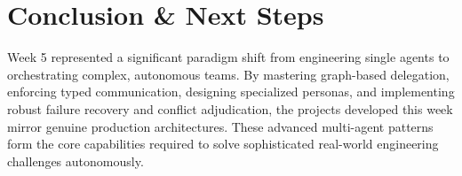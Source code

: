 \documentclass[12pt, a4paper]{article}
\begin{document}
\vspace{0.5cm}

\section{Conclusion \& Next Steps}
Week 5 represented a significant paradigm shift from engineering single agents to orchestrating complex, autonomous teams. By mastering graph-based delegation, enforcing typed communication, designing specialized personas, and implementing robust failure recovery and conflict adjudication, the projects developed this week mirror genuine production architectures. These advanced multi-agent patterns form the core capabilities required to solve sophisticated real-world engineering challenges autonomously.
\end{document}
